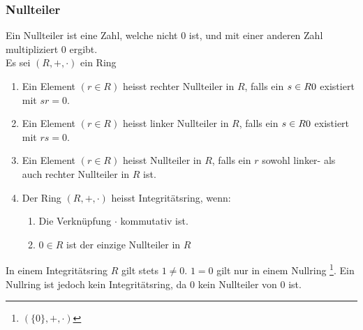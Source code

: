 \subsubsection*{Nullteiler}
\begin{definition}
Ein Nullteiler ist eine Zahl, welche nicht 0 ist, und mit einer anderen Zahl multipliziert 0 ergibt.\\
Es sei $(R, +, \cdot)$ ein Ring
	\begin{enumerate}
		\item Ein Element $(r \in R)$ heisst rechter Nullteiler in $R$, falls ein $s \in R\\{0}$ existiert mit $sr = 0$.
		\item Ein Element $(r \in R)$ heisst linker Nullteiler in $R$, falls ein $s \in R\\{0}$ existiert mit $rs = 0$.
		\item Ein Element $(r \in R)$ heisst Nullteiler in $R$, falls ein $r$ sowohl linker- als auch rechter Nullteiler in $R$ ist.
		\item Der Ring $(R, +, \cdot)$ heisst Integritätsring, wenn:
		\begin{enumerate}
			\item Die Verknüpfung $\cdot$ kommutativ ist.
			\item $0 \in R$ ist der einzige Nullteiler in $R$
		\end{enumerate}
	\end{enumerate}
\end{definition}
\begin{bem}
In einem Integritätsring $R$ gilt stets $1 \neq 0$. $1=0$ gilt nur in einem Nullring \footnote{$(\{0\}, +, \cdot)$}. Ein Nullring ist jedoch kein Integritätsring, da $0$ kein Nullteiler von $0$ ist.
\end{bem}

